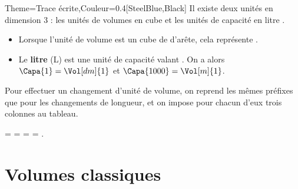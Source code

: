 \begin{Maquette}[Cours]{Theme={Trace écrite},Couleur={0.4[SteelBlue,Black]}}
      Il existe deux unités en dimension 3 : les unités de volumes en \og cube \fg{} et les unités de capacité en \og litre \fg. 

      \begin{definition*}{}
         \begin{itemize}
            \item Lorsque l'unité de volume est un cube de  d'arête, cela représente .
            \item Le {\bf litre} (L) est une unité de capacité valant . On a alors $\Capa{1} =\Vol[dm]{1}$ et $\Capa{1000} =\Vol[m]{1}$.
         \end{itemize}
      \end{definition*}

      Pour effectuer un changement d'unité de volume, on reprend les mêmes préfixes que pour les changements de longueur, et on impose pour chacun d'eux trois colonnes au tableau. \medskip


      \begin{exemple*}{}
          =  =  =  = .
      \end{exemple*}
         
   
   \section{Volumes classiques}

      \begin{minipage}[t]{5.5cm}
         \Formule[Volume,Solide=pave,Largeur=5.5cm,Ancre={(2.75,-2)},Couleur=yellow!10]
      \end{minipage}
      \qquad
      \begin{minipage}[t]{4.5cm}
         \Formule[Volume,Solide=prisme,Largeur=4.5cm,Ancre={(2.25,-2)},Couleur=yellow!10]
      \end{minipage}
      \qquad
      \begin{minipage}[t]{6cm}
         \Formule[Volume,Solide=cylindre,Largeur=6cm,Ancre={(3,-2)},Couleur=yellow!10]
      \end{minipage}

\end{Maquette}


